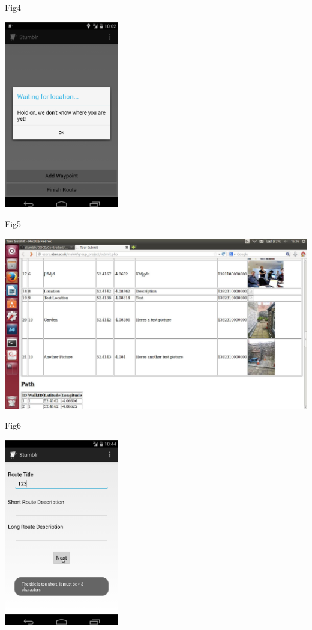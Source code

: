 \documentclass{article}
\begin{document}
\begin{center}
	\vspace{1in}
	Fig4
	
	\includegraphics[width=5cm]{4}
	
	\clearpage
	Fig5
	
	\includegraphics[width=15cm]{10}

	\vspace{1in}	
	Fig6
	
	\includegraphics[width=5cm]{20}
	

\end{center}
\end{document}
